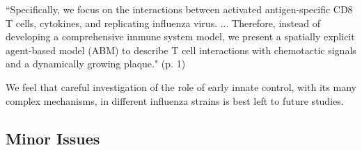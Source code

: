 \documentclass[10pt]{article}
\newenvironment{response}{\fontfamily{cms}\selectfont\small}{\par}
\begin{document}
\begin{enumerate}
\begin{response}
\begin{displayquote}
``Specifically, we focus on the interactions between activated antigen-specific CD8 T cells, cytokines, and replicating influenza virus. ... Therefore, instead of developing a comprehensive immune system model, we present a spatially explicit agent-based model (ABM) to
describe T cell interactions with chemotactic signals and a dynamically growing plaque." (p. 1)
\end{displayquote}

We feel that careful investigation of the role of early innate control, with its many complex mechanisms, in different influenza strains is best left to future studies.

\end{response}

\end{enumerate}

\subsection*{Minor Issues}
\end{document}
